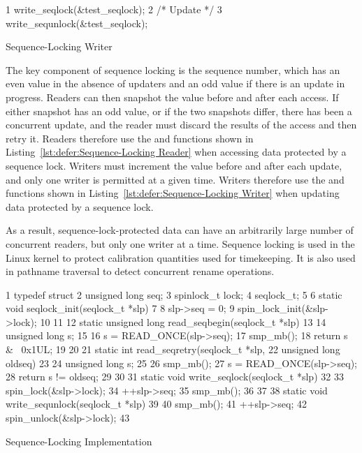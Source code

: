 \begin{listing}[bp]
{ \scriptsize
\begin{verbbox}
  1 write_seqlock(&test_seqlock);
  2 /* Update */
  3 write_sequnlock(&test_seqlock);
\end{verbbox}
}
\centering
\theverbbox
\caption{Sequence-Locking Writer}
\label{lst:defer:Sequence-Locking Writer}
\end{listing}

The key component of sequence locking is the sequence number, which has
an even value in the absence of updaters and an odd value if there
is an update in progress.
Readers can then snapshot the value before and after each access.
If either snapshot has an odd value, or if the two snapshots differ,
there has been a concurrent update, and the reader must discard
the results of the access and then retry it.
Readers therefore use the  and 
functions shown in Listing~\ref{lst:defer:Sequence-Locking Reader}
when accessing data protected by a sequence lock.
Writers must increment the value before and after each update,
and only one writer is permitted at a given time.
Writers therefore use the  and 
functions shown in Listing~\ref{lst:defer:Sequence-Locking Writer}
when updating data protected by a sequence lock.

As a result, sequence-lock-protected data can have an arbitrarily
large number of concurrent readers, but only one writer at a time.
Sequence locking is used in the Linux kernel to protect calibration
quantities used for timekeeping.
It is also used in pathname traversal to detect concurrent rename operations.

\begin{listing}[tb]
{ \scriptsize
\begin{verbbox}
 1  typedef struct {
 2    unsigned long seq;
 3    spinlock_t lock;
 4  } seqlock_t;
 5
 6  static void seqlock_init(seqlock_t *slp)
 7  {
 8    slp->seq = 0;
 9    spin_lock_init(&slp->lock);
10  }
11
12  static unsigned long read_seqbegin(seqlock_t *slp)
13  {
14    unsigned long s;
15
16    s = READ_ONCE(slp->seq);
17    smp_mb();
18    return s & ~0x1UL;
19  }
20
21  static int read_seqretry(seqlock_t *slp,
22                           unsigned long oldseq)
23  {
24    unsigned long s;
25
26    smp_mb();
27    s = READ_ONCE(slp->seq);
28    return s != oldseq;
29  }
30
31  static void write_seqlock(seqlock_t *slp)
32  {
33    spin_lock(&slp->lock);
34    ++slp->seq;
35    smp_mb();
36  }
37
38  static void write_sequnlock(seqlock_t *slp)
39  {
40    smp_mb();
41    ++slp->seq;
42    spin_unlock(&slp->lock);
43  }
\end{verbbox}
}
\centering
\theverbbox
\caption{Sequence-Locking Implementation}
\label{lst:defer:Sequence-Locking Implementation}
\end{listing}

